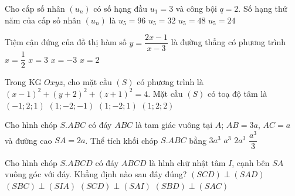 \begin{ex}%
Cho cấp số nhân $\left(u_n\right)$ có số hạng đầu $u_1=3$ và công bội $q=2$. Số hạng thứ năm của cấp số nhân $\left(u_n\right)$ là
\choice
{$u_5=96$}
{$u_5=32$}
{\True $u_5=48$}
{$u_5=24$}
\end{ex}
\begin{ex}%
Tiệm cận đứng của đồ thị hàm số $y=\dfrac{2x-1}{x-3}$ là đường thẳng có phương trình
\choice
{$x=\dfrac{1}{2}$}
{\True $x=3$}
{$x=-3$}
{$x=2$}
\end{ex}
\begin{ex}%
Trong KG $Oxyz$, cho mặt cầu $(S)$ có phương trình là $\left(x-1\right)^2+\left(y+2\right)^2+\left(z+1\right)^2=4$. Mặt cầu $(S)$ có toạ độ tâm là
\choice
{$\left(-1;2;1\right)$}
{\True $\left(1;-2;-1\right)$}
{$\left(1;-2;1\right)$}
{$\left(1;2;2\right)$}
\end{ex}
\begin{ex}%
Cho hình chóp $S.ABC$ có đáy $ABC$ là tam giác vuông tại $A$; $AB=3a$, $AC=a$ và đường cao $SA=2a$. Thể tích khối chóp $S.ABC$ bằng
\choice
{$3a^3$}
{\True $a^3$}
{$2a^3$}
{$\dfrac{a^3}{3}$}
\end{ex}
\begin{ex}%
Cho hình chóp $S.ABCD$ có đáy $ABCD$ là hình chữ nhật tâm $I$, cạnh bên $SA$ vuông góc với đáy. Khẳng định nào sau đây đúng?
\choice
{\True $(SCD)\perp(SAD)$}
{$(SBC)\perp(SIA)$}
{$(SCD)\perp(SAI)$}
{$(SBD)\perp(SAC)$}
\end{ex}
